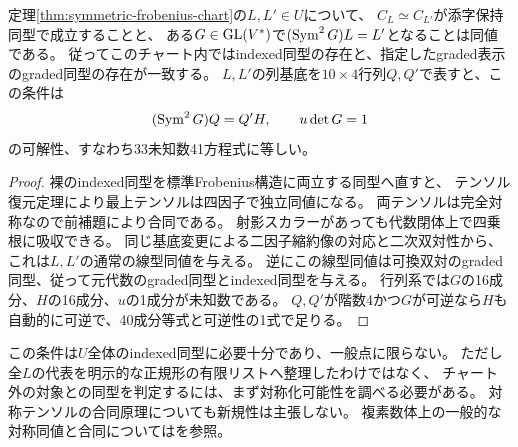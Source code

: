 \begin{corollary}[対称チャート内の完全なindexed同型条件]\label{cor:symmetric-chart-isomorphism}
定理\ref{thm:symmetric-frobenius-chart}の$L,L'\in U$について、
$C_L\simeq C_{L'}$が添字保持同型で成立することと、
ある$G\in\operatorname{GL}(V^*)$で$(\operatorname{Sym}^2G)L=L'$となることは同値である。
従ってこのチャート内ではindexed同型の存在と、指定したgraded表示のgraded同型の存在が一致する。
$L,L'$の列基底を$10\times4$行列$Q,Q'$で表すと、この条件は
\[
 (\operatorname{Sym}^2G)Q=Q'H,\qquad u\det G=1
\]
の可解性、すなわち33未知数41方程式に等しい。
\end{corollary}
\begin{proof}
裸のindexed同型を標準Frobenius構造に両立する同型へ直すと、
テンソル復元定理により最上テンソルは四因子で独立同値になる。
両テンソルは完全対称なので前補題により合同である。
射影スカラーがあっても代数閉体上で四乗根に吸収できる。
同じ基底変更による二因子縮約像の対応と二次双対性から、
これは$L,L'$の通常の線型同値を与える。
逆にこの線型同値は可換双対のgraded同型、従って元代数のgraded同型とindexed同型を与える。
行列系では$G$の16成分、$H$の16成分、$u$の1成分が未知数である。
$Q,Q'$が階数4かつ$G$が可逆なら$H$も自動的に可逆で、40成分等式と可逆性の1式で足りる。
\end{proof}
\begin{remark}
この条件は$U$全体のindexed同型に必要十分であり、一般点に限らない。
ただし全$L$の代表を明示的な正規形の有限リストへ整理したわけではなく、
チャート外の対象との同型を判定するには、まず対称化可能性を調べる必要がある。
対称テンソルの合同原理についても新規性は主張しない。
複素数体上の一般的な対称同値と合同については\cite[Theorem 2(a)]{BS2006}を参照。
\end{remark}

